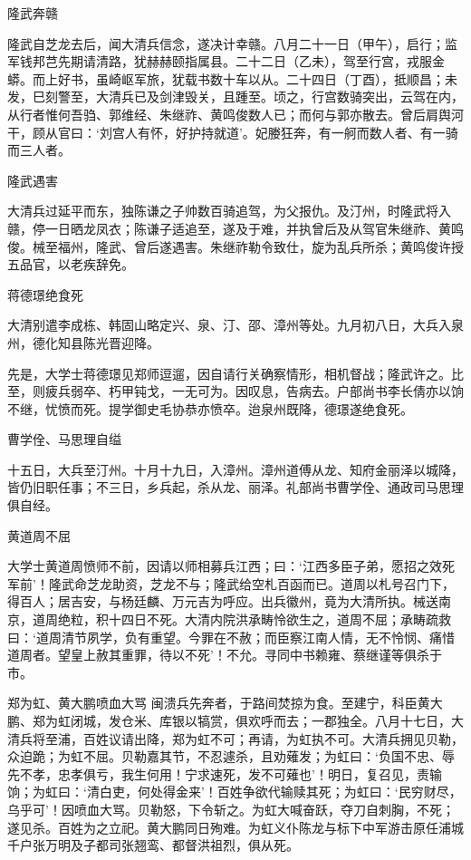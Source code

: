 \documentclass[]{article}
\begin{document}
隆武奔赣

隆武自芝龙去后，闻大清兵信念，遂决计幸赣。八月二十一日（甲午），启行；监军钱邦芑先期请清路，犹赫赫颐指属县。二十二日（乙未），驾至行宫，戎服金蟒。而上好书，虽崎岖军旅，犹载书数十车以从。二十四日（丁酉），抵顺昌；未发，巳刻警至，大清兵已及剑津毁关，且踵至。顷之，行宫数骑突出，云驾在内，从行者惟何吾驺、郭维经、朱继祚、黄鸣俊数人已；而何与郭亦散去。曾后肩舆河干，顾从官曰：`刘宫人有怀，好护持就道'。妃媵狂奔，有一舸而数人者、有一骑而三人者。

隆武遇害

大清兵过延平而东，独陈谦之子帅数百骑追驾，为父报仇。及汀州，时隆武将入赣，停一日晒龙凤衣；陈谦子适追至，遂及于难，并执曾后及从驾官朱继祚、黄鸣俊。械至福州，隆武、曾后遂遇害。朱继祚勒令致仕，旋为乱兵所杀；黄鸣俊许授五品官，以老疾辞免。

蒋德璟绝食死

大清别遣李成栋、韩固山略定兴、泉、汀、邵、漳州等处。九月初八日，大兵入泉州，德化知县陈光晋迎降。

先是，大学士蒋德璟见郑师逗遛，因自请行关确察情形，相机督战；隆武许之。比至，则疲兵弱卒、朽甲钝戈，一无可为。因叹息，告病去。户部尚书李长倩亦以饷不继，忧愤而死。提学御史毛协恭亦愤卒。迨泉州既降，德璟遂绝食死。

曹学佺、马思理自缢

十五日，大兵至汀州。十月十九日，入漳州。漳州道傅从龙、知府金丽泽以城降，皆仍旧职任事；不三日，乡兵起，杀从龙、丽泽。礼部尚书曹学佺、通政司马思理俱自经。

黄道周不屈

大学士黄道周愤师不前，因请以师相募兵江西；曰：`江西多臣子弟，愿招之效死军前'！隆武命芝龙助资，芝龙不与；隆武给空札百函而已。道周以札号召门下，得百人；居吉安，与杨廷麟、万元吉为呼应。出兵徽州，竟为大清所执。械送南京，道周绝粒，积十四日不死。大清内院洪承畴怜欲生之，道周不屈；承畴疏救曰：`道周清节夙学，负有重望。今罪在不赦；而臣察江南人情，无不怜悯、痛惜道周者。望皇上赦其重罪，待以不死'！不允。寻同中书赖雍、蔡继谨等俱杀于市。

郑为虹、黄大鹏喷血大骂
闽溃兵先奔者，于路间焚掠为食。至建宁，科臣黄大鹏、郑为虹闭城，发仓米、库银以犒赏，俱欢呼而去；一郡独全。八月十七日，大清兵将至浦，百姓议请出降，郑为虹不可；再请，为虹执不可。大清兵拥见贝勒，众迫跪；为虹不屈。贝勒嘉其节，不忍遽杀，且劝薙发；为虹曰：`负国不忠、辱先不孝，忠孝俱亏，我生何用！宁求速死，发不可薙也'！明日，复召见，责输饷；为虹曰：`清白吏，何处得金来'！百姓争欲代输赎其死；为虹曰：`民穷财尽，乌乎可'！因喷血大骂。贝勒怒，下令斩之。为虹大喊奋跃，夺刀自刺胸，不死；遂见杀。百姓为之立祀。黄大鹏同日殉难。为虹义仆陈龙与标下中军游击原任浦城千户张万明及子都司张翘鸾、都督洪祖烈，俱从死。
\end{document}
